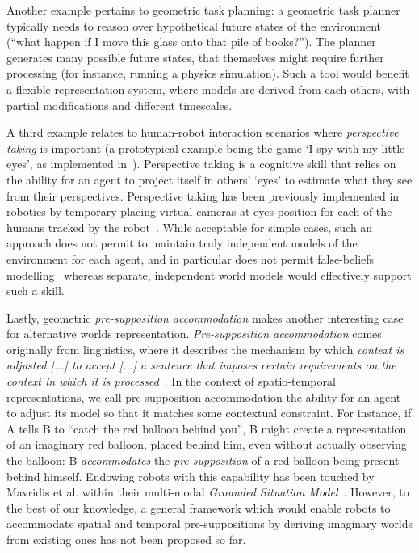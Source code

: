\documentclass[letterpaper, 10 pt, conference]{ieeeconf}  %
\newcommand{\etal}{et al.\xspace}
\begin{document}
Another example pertains to geometric task planning: a geometric task planner
typically needs to reason over hypothetical future states of the environment
(``what happen if I move this glass onto that pile of books?'').  The planner
generates many possible future states, that themselves might require further
processing (for instance, running a physics simulation). Such a tool would
benefit a flexible representation system, where models are derived from each
others, with partial modifications and different timescales.

A third example relates to human-robot interaction scenarios where \emph{perspective
taking} is important (a prototypical example being the game `I spy with my
little eyes', as implemented in~\cite{ros2010which}). Perspective taking is a
cognitive skill that relies on the ability for an agent to project itself in
others' `eyes' to estimate what they see from their perspectives. 
Perspective taking has been previously implemented in robotics by temporary placing
virtual cameras at eyes position for each of the humans tracked by the
robot~\cite{ros2010solving}. While acceptable for simple cases, such an approach
does not permit to maintain truly independent models of the environment for each
agent, and in particular does not permit false-beliefs
modelling~\cite{lemaignan2015mutual} whereas separate, independent world models
would effectively support such a skill.

Lastly, geometric \emph{pre-supposition accommodation} makes another interesting
case for alternative worlds representation. \emph{Pre-supposition accommodation}
comes originally from linguistics, where it describes the mechanism by which
\emph{context is adjusted [...] to accept [...] a sentence that imposes certain
requirements on the context in which it is
processed}~\cite{vonfintel2008presupposition}. In the context of spatio-temporal
representations, we call pre-supposition accommodation the ability for an agent
to adjust its model so that it matches some contextual constraint. For instance,
if A tells B to ``catch the red balloon behind you'', B might create a
representation of an imaginary red balloon, placed behind him, even without
actually observing the balloon: B \emph{accommodates} the \emph{pre-supposition}
of a red balloon being present behind himself. Endowing robots with this
capability has been touched by Mavridis \etal within their multi-modal
\emph{Grounded Situation Model}~\cite{Mavridis2006}. However, to the best of our
knowledge, a general framework which would enable robots to accommodate spatial
and temporal pre-suppositions by deriving imaginary worlds from existing ones
has not been proposed so far.
\end{document}
